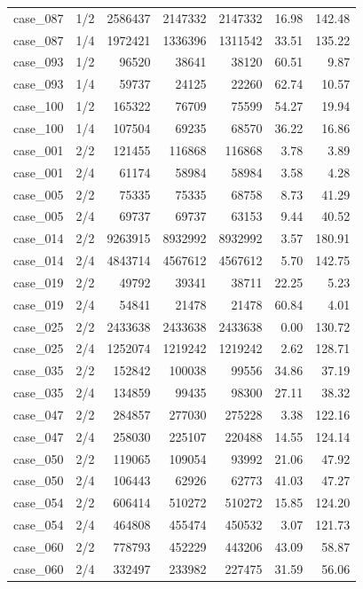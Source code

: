 \begin{tabular}{llrrrrr}
case\_087 & 1/2 & 2586437 & 2147332 & 2147332 & 16.98 & 142.48 \\
case\_087 & 1/4 & 1972421 & 1336396 & 1311542 & 33.51 & 135.22 \\
case\_093 & 1/2 & 96520 & 38641 & 38120 & 60.51 & 9.87 \\
case\_093 & 1/4 & 59737 & 24125 & 22260 & 62.74 & 10.57 \\
case\_100 & 1/2 & 165322 & 76709 & 75599 & 54.27 & 19.94 \\
case\_100 & 1/4 & 107504 & 69235 & 68570 & 36.22 & 16.86 \\
case\_001 & 2/2 & 121455 & 116868 & 116868 & 3.78 & 3.89 \\
case\_001 & 2/4 & 61174 & 58984 & 58984 & 3.58 & 4.28 \\
case\_005 & 2/2 & 75335 & 75335 & 68758 & 8.73 & 41.29 \\
case\_005 & 2/4 & 69737 & 69737 & 63153 & 9.44 & 40.52 \\
case\_014 & 2/2 & 9263915 & 8932992 & 8932992 & 3.57 & 180.91 \\
case\_014 & 2/4 & 4843714 & 4567612 & 4567612 & 5.70 & 142.75 \\
case\_019 & 2/2 & 49792 & 39341 & 38711 & 22.25 & 5.23 \\
case\_019 & 2/4 & 54841 & 21478 & 21478 & 60.84 & 4.01 \\
case\_025 & 2/2 & 2433638 & 2433638 & 2433638 & 0.00 & 130.72 \\
case\_025 & 2/4 & 1252074 & 1219242 & 1219242 & 2.62 & 128.71 \\
case\_035 & 2/2 & 152842 & 100038 & 99556 & 34.86 & 37.19 \\
case\_035 & 2/4 & 134859 & 99435 & 98300 & 27.11 & 38.32 \\
case\_047 & 2/2 & 284857 & 277030 & 275228 & 3.38 & 122.16 \\
case\_047 & 2/4 & 258030 & 225107 & 220488 & 14.55 & 124.14 \\
case\_050 & 2/2 & 119065 & 109054 & 93992 & 21.06 & 47.92 \\
case\_050 & 2/4 & 106443 & 62926 & 62773 & 41.03 & 47.27 \\
case\_054 & 2/2 & 606414 & 510272 & 510272 & 15.85 & 124.20 \\
case\_054 & 2/4 & 464808 & 455474 & 450532 & 3.07 & 121.73 \\
case\_060 & 2/2 & 778793 & 452229 & 443206 & 43.09 & 58.87 \\
case\_060 & 2/4 & 332497 & 233982 & 227475 & 31.59 & 56.06 \\

\end{tabular}
